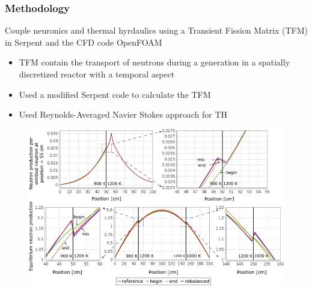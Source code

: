 \begin{frame}
  \frametitle{Methodology}
        Couple neuronics and thermal hyrdaulics using a Transient Fission Matrix (TFM)
        in Serpent and the CFD code OpenFOAM
        \begin{itemize}
                \item TFM contain the transport of neutrons during a generation in a spatially discretized reactor with a temporal aspect
                \item Used a modified Serpent code to calculate the TFM
                \item Used Reynolds-Averaged Navier Stokes approach for TH

        \end{itemize}

        \begin{figure}
                \centering
                \includegraphics[scale=0.5]{JC-Oct16/neutron-matrix.jpg}
                \label{fig:matrix}
        \end{figure}

\end{frame}


